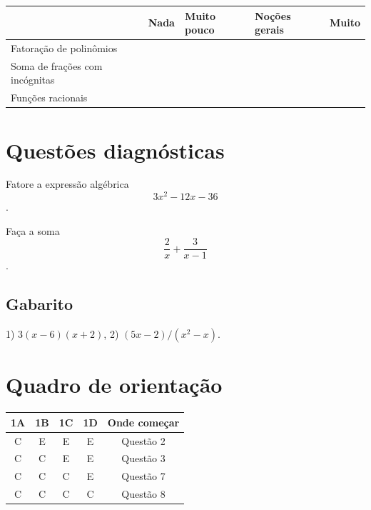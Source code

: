 \documentclass[main.tex]{subfiles}
\begin{document}
\begin{center}
 \begin{tabular}{|p{25mm}||p{10mm}|p{10mm}|p{10mm}|p{10mm}|} 
 \hline
   & Nada & Muito pouco & Noções gerais & Muito\\
 \hline
 Fatoração de polinômios &  &  &  &  \\ 
 \hline
 Soma de frações com incógnitas &  &  &  &  \\
 \hline
 Funções racionais &  &  &  &  \\
 \hline
\end{tabular}
\end{center}

\paraAmbos

\section{Questões diagnósticas}

\begin{diagnostico}
Fatore a expressão algébrica $$3x^2-12x-36$$.
\end{diagnostico}
  
\begin{diagnostico}
Faça a soma $$\frac{2}{x}+\frac{3}{x-1}$$.
\end{diagnostico}

\paraTutores
\subsection{Gabarito}

1) $3(x-6)(x+2)$, 2) $(5x-2)/(x^2-x)$.

\section{Quadro de orientação}

\begin{center}
 \begin{tabular}{|c c c c |c|} 
 \hline
 1A & 1B & 1C & 1D & Onde começar\\
 \hline
 C & E & E & E & Questão 2 \\ 
 \hline
 C & C & E & E & Questão 3 \\ 
 \hline
 C & C & C & E & Questão 7 \\ 
 \hline
 C & C & C & C & Questão 8 \\ 
 \hline
\end{tabular}
\end{center}
\end{document}
